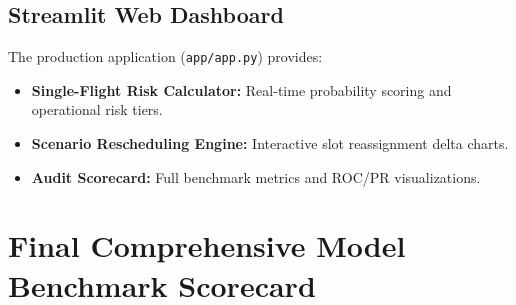 \documentclass[11pt,a4paper]{article}
\begin{document}
\subsection{Streamlit Web Dashboard}
The production application (\texttt{app/app.py}) provides:
\begin{itemize}[noitemsep]
    \item \textbf{Single-Flight Risk Calculator:} Real-time probability scoring and operational risk tiers.
    \item \textbf{Scenario Rescheduling Engine:} Interactive slot reassignment delta charts.
    \item \textbf{Audit Scorecard:} Full benchmark metrics and ROC/PR visualizations.
\end{itemize}

\section{Final Comprehensive Model Benchmark Scorecard}
\end{document}
